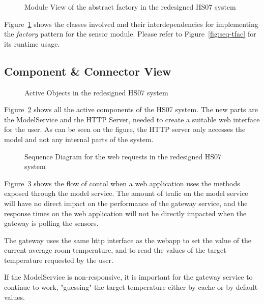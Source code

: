 \documentclass[a4paper,10pt]{article}
\begin{document}
\begin{figure}[!htb]
\centerline{}
\caption{Module View of the abstract factory in the redesigned HS07 system}
\label{fig:mv-factory}
\end{figure}
Figure~\ref{fig:mv-factory} shows the classes involved and their interdependencies for implementing the \emph{factory} pattern for the sensor module. Please refer to Figure~\ref{fig:seq-tfac} for its runtime usage.

\subsection{Component \& Connector View}

\begin{figure}[!htb]
\centerline{}
\caption{Active Objects in the redesigned HS07 system}
\label{fig:activeobjects}
\end{figure}

Figure~\ref{fig:activeobjects} shows all the active components of the HS07 system. The new parts are the ModelService and the HTTP Server, needed to create a suitable web interface for the user. As can be seen on the figure, the HTTP server only accesses the model and not any internal parts of the system.

\clearpage

\begin{figure}[!htb]
\centerline{}
\caption{Sequence Diagram for the web requests in the redesigned HS07 system}
\label{fig:seq-stt}
\end{figure}

Figure~\ref{fig:seq-stt} shows the flow of contol when a web application uses the methods exposed through the model service. The amount of trafic on the model service will have no direct impact on the performance of the gateway service, and the response times on the web application will not be directly impacted when the gateway is polling the sensors.

The gateway uses the same http interface as the webapp to set the value of the current average room temperature, and to read the values of the target temperature requested by the user.

If the ModelService is non-responsive, it is important for the gateway service to continue to work, "guessing" the target temperature either by cache or by default values.
\end{document}
